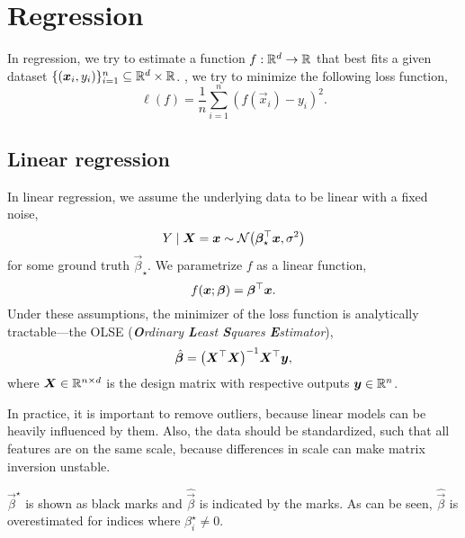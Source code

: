 \section{Regression}

In regression, we try to estimate a function $f: \mathbb{R}^d \to \mathbb{R}$ that best fits a given dataset $\{
    (\bm{x}_i, y_i) \}_{i=1}^n \subseteq \mathbb{R}^d \times \mathbb{R}$. \Ie, we try to minimize the following loss
function, \[
    \ell(f) = \frac{1}{n} \sum_{i=1}^{n} (f(\vec{x}_i) - y_i)^2.
\]

\subsection{Linear regression}

In linear regression, we assume the underlying data to be linear with a fixed noise, \[
    Y \mid \vec{X} = \vec{x} \sim \mathcal{N} \lft( \transpose{\vec{\beta}_\star} \vec{x}, \sigma^2 \rgt)
\]
for some ground truth $\vec{\beta}_\star$. We parametrize $f$ as a linear function, \[
    f(\bm{x}; \bm{\beta}) = \bm{\beta}^\top \bm{x}.
\]
Under these assumptions, the minimizer of the loss function is analytically tractable---the OLSE
(\textit{\textbf{O}rdinary \textbf{L}east \textbf{S}quares \textbf{E}stimator}), \[
    \hat{\vec{\beta}} = \inv{\lft( \transpose{\mat{X}} \mat{X} \rgt)} \transpose{\mat{X}} \vec{y},
\]
where $\bm{X} \in \mathbb{R}^{n \times d}$ is the design matrix with respective outputs $\bm{y} \in
    \mathbb{R}^n$.

In practice, it is important to remove outliers, because linear models can be heavily influenced by
them. Also, the data should be standardized, such that all features are on the same scale, because
differences in scale can make matrix inversion unstable.

\begin{marginfigure}
    \caption{$\vec{\beta}^\star$ is shown as black marks and $\hat{\vec{\beta}}$ is indicated by the marks. As can be seen, $\hat{\vec{\beta}}$ is overestimated for indices where $\beta^\star_i \neq 0$.}
    \label{fig:overestimation}
\end{marginfigure}

